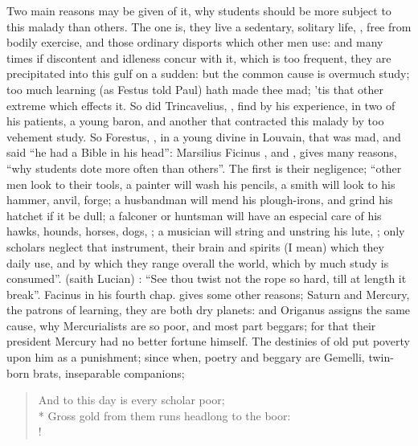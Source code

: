 Two main reasons may be given of it, why students should be more subject to
this malady than others. The one is, they live a sedentary, solitary life,
, free from bodily exercise, and those ordinary disports
which other men use: and many times if discontent and idleness concur with it,
which is too frequent, they are precipitated into this gulf on a sudden: but
the common cause is overmuch study; too much learning (as
Festus told Paul) hath made thee mad; 'tis that other
extreme which effects it. So did Trincavelius, , find by his experience, in two of his patients, a young
baron, and another that contracted this malady by too vehement study. So
Forestus, , in a young divine
in Louvain, that was mad, and said \enquote{he had a Bible in his
head}: Marsilius Ficinus , and , gives many reasons,
\enquote{why students dote more often than others}. The first is
their negligence; \enquote{other men look to their tools, a
painter will wash his pencils, a smith will look to his hammer, anvil, forge; a
husbandman will mend his plough-irons, and grind his hatchet if it be dull; a
falconer or huntsman will have an especial care of his hawks, hounds, horses,
dogs, \etc{}; a musician will string and unstring his lute, \etc{}; only
scholars neglect that instrument, their brain and spirits (I mean) which they
daily use, and by which they range overall the world, which by much study is
consumed}.  (saith Lucian) : \enquote{See thou twist not the rope so hard, till at length it
break}. Facinus in his fourth chap. gives some other
reasons; Saturn and Mercury, the patrons of learning, they are both dry
planets: and Origanus assigns the same cause, why Mercurialists are so poor,
and most part beggars; for that their president Mercury had no better fortune
himself. The destinies of old put poverty upon him as a punishment; since when,
poetry and beggary are Gemelli, twin-born brats, inseparable companions;

\begin{verse}%
\end{verse}%
\begin{verse}%
And to this day is every scholar poor;\\*
Gross gold from them runs headlong to the boor:\\!
\end{verse}%

